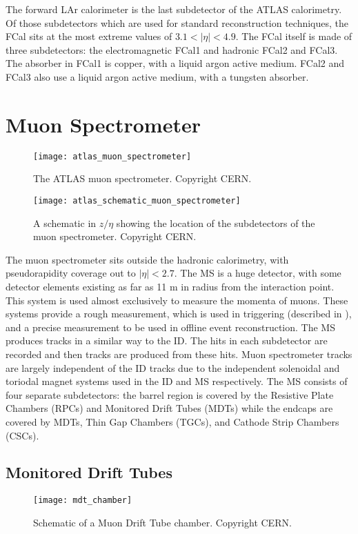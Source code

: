 The forward LAr calorimeter is the last subdetector of the ATLAS calorimetry.
Of those subdetectors which are used for standard reconstruction techniques, the FCal sits at the most extreme values of $ 3.1 < |\eta| < 4.9$.
The FCal itself is made of three subdetectors: the electromagnetic FCal1 and hadronic FCal2 and FCal3.
The absorber in FCal1 is copper, with a liquid argon active medium.
FCal2 and FCal3 also use a liquid argon active medium, with a tungsten absorber.

\section{Muon Spectrometer}
\begin{figure}[tbp]
\caption{The ATLAS muon spectrometer. Copyright CERN.} \label{fig:atlas_muon_spectrometer}
\texttt{[image: atlas\_muon\_spectrometer]}
\end{figure}

\begin{figure}[tbp]
\caption{A schematic in $z/\eta$ showing the location of the subdetectors of the muon spectrometer. Copyright CERN.} \label{fig:atlas_schematic_muon_spectrometer}
\texttt{[image: atlas\_schematic\_muon\_spectrometer]}
\end{figure}

The muon spectrometer sits outside the hadronic calorimetry, with pseudorapidity coverage out to $|\eta| < 2.7$.
The MS is a huge detector, with some detector elements existing as far as 11 m in radius from the interaction point.
This system is used almost exclusively to measure the momenta of muons.
These systems provide a rough measurement, which is used in triggering (described in ), and a precise measurement to be used in offline event reconstruction.
The MS produces tracks in a similar way to the ID.
The hits in each subdetector are recorded and then tracks are produced from these hits.
Muon spectrometer tracks are largely independent of the ID tracks due to the independent solenoidal and toriodal magnet systems used in the ID and MS respectively.
The MS consists of four separate subdetectors: the barrel region is covered by the Resistive Plate Chambers (RPCs) and Monitored Drift Tubes (MDTs) while the endcaps are covered by MDTs, Thin Gap Chambers (TGCs), and Cathode Strip Chambers (CSCs).

\subsection{Monitored Drift Tubes}
\begin{figure}[tbp]
\caption{Schematic of a Muon Drift Tube chamber. Copyright CERN.} \label{fig:mdt_chamber}
\texttt{[image: mdt\_chamber]}
\end{figure}

